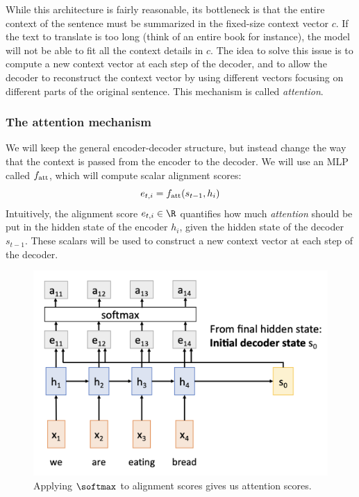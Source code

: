 While this architecture is fairly reasonable, its bottleneck is that the entire context of the sentence must be summarized in the fixed-size context vector $c$. If the text to translate is too long (think of an entire book for instance), the model will not be able to fit all the context details in $c$. The idea to solve this issue is to compute a new context vector at each step of the decoder, and to allow the decoder to reconstruct the context vector by using different vectors focusing on different parts of the original sentence. This mechanism is called \emph{attention}.

\subsubsection{The attention mechanism}
We will keep the general encoder-decoder structure, but instead change the way that the context is passed from the encoder to the decoder. We will use an MLP called $f_{\textnormal{att}}$, which will compute scalar alignment scores:
\begin{equation*}
    e_{t,i} = f_{\textnormal{att}}(s_{t-1}, h_i)
\end{equation*}
Intuitively, the alignment score $e_{t,i}\in\R$ quantifies how much \emph{attention} should be put in the hidden state of the encoder $h_i$, given the hidden state of the decoder $s_{t-1}$. These scalars will be used to construct a new context vector at each step of the decoder.

\begin{figure}[H]
    \centering
    \includegraphics[width=.5\textwidth]{images/attention-scores.png}
    \caption{Applying $\softmax$ to alignment scores gives us attention scores.}
\end{figure}


